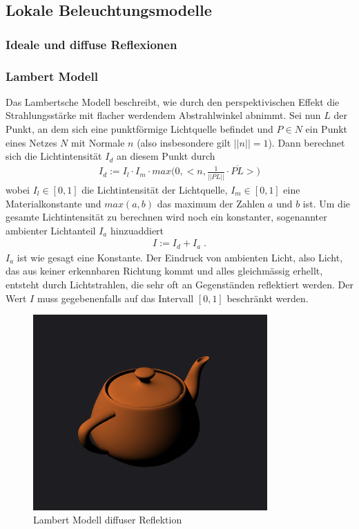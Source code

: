 \subsection{Lokale Beleuchtungsmodelle}
\subsubsection{Ideale und diffuse Reflexionen}
\subsubsection{Lambert  Modell}
Das Lambertsche Modell beschreibt, wie durch den perspektivischen Effekt die Strahlungsstärke mit flacher werdendem Abstrahlwinkel abnimmt. Sei nun $L$ der Punkt, an dem sich eine punktförmige Lichtquelle befindet und $P \in N$ ein Punkt eines Netzes $N$ mit Normale $n$ (also insbesondere gilt $||n|| = 1$).  Dann berechnet sich die Lichtintensität $I_d$ an diesem Punkt durch
\begin{align*}
I_d :=  I_l \cdot I_m \cdot max\biggl ( 0, \biggl< n, \frac{1}{||\overline{PL}||} \cdot \overline{PL} \biggr> \biggr)
\end{align*}
wobei $I_l \in [0,1]$ die Lichtintensität der Lichtquelle, $I_m \in [0,1]$ eine Materialkonstante und $max(a,b)$ das maximum der Zahlen $a$ und $b$ ist. 
Um die gesamte Lichtintensität zu berechnen wird noch ein konstanter, sogenannter ambienter Lichtanteil $I_a$ hinzuaddiert
\begin{align}
I := I_d + I_a \;.
\end{align} 
$I_a$ ist wie gesagt eine Konstante.
 Der Eindruck von ambienten Licht, also Licht, das aus keiner erkennbaren Richtung kommt und alles gleichmässig erhellt, entsteht durch Lichtstrahlen, die sehr oft an Gegenständen reflektiert werden.
Der Wert $I$ muss gegebenenfalls auf das Intervall $[0,1]$ beschränkt werden.
\begin{figure}[H]
    \centering
    \includegraphics[width=0.8\textwidth]{images/lambert.png}
    \caption{Lambert Modell diffuser Reflektion}
    \label{fig:reflection-lambert-diffuse-model}
\end{figure}

